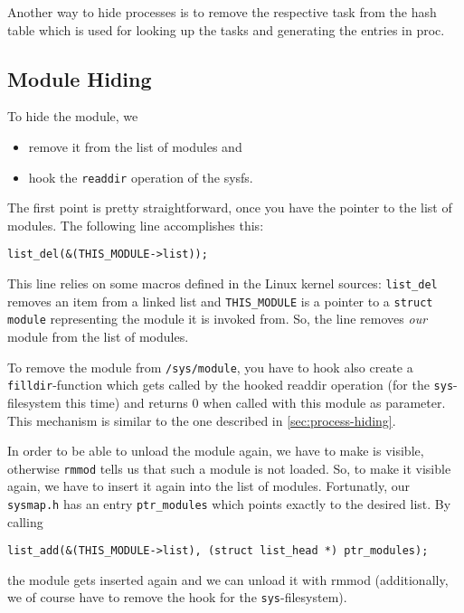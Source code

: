\documentclass[10pt, letterpaper]{scrartcl}
\begin{document}
Another way to hide processes is to remove the respective task from the hash table which is used for looking up the tasks and generating the entries in proc.

\subsection{Module Hiding}
\label{sec:module_hiding}

To hide the module, we 
\begin{itemize}
 \item remove it from the list of modules and
 \item hook the \texttt{readdir} operation of the sysfs.
\end{itemize}

The first point is pretty straightforward, once you have the pointer to the list of modules. The following line accomplishes this:

\begin{verbatim}
list_del(&(THIS_MODULE->list));
\end{verbatim}

This line relies on some macros defined in the Linux kernel sources: \texttt{list\_del} removes an item from a linked list and \texttt{THIS\_MODULE} is a pointer to a \texttt{struct module} representing the module it is invoked from. So, the line removes \emph{our} module from the list of modules.

To remove the module from \texttt{/sys/module}, you have to hook also create a \texttt{filldir}-function which gets called by the hooked readdir operation (for the \texttt{sys}-filesystem this time) and returns 0 when called with this module as parameter. This mechanism is similar to the one described in \autoref{sec:process-hiding}.


In order to be able to unload the module again, we have to make is visible, otherwise \texttt{rmmod} tells us that such a module is not loaded. So, to make it visible again, we have to insert it again into the list of modules. Fortunatly, our \texttt{sysmap.h} has an entry \texttt{ptr\_modules} which points exactly to the desired list. By calling 
\begin{verbatim}
list_add(&(THIS_MODULE->list), (struct list_head *) ptr_modules);
\end{verbatim}
the module gets inserted again and we can unload it with rmmod (additionally, we of course have to remove the hook for the \texttt{sys}-filesystem). 
\end{document}
